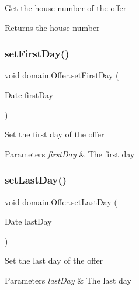 Get the house number of the offer

\begin{DoxyReturn}{Returns}
the house number 
\end{DoxyReturn}
\mbox{\label{classdomain_1_1_offer_aca5c8e3d34e700c8e51d1c9a0685e68f}} 
\subsubsection{\texorpdfstring{setFirstDay()}{setFirstDay()}}
{\footnotesize\ttfamily void domain.\+Offer.\+set\+First\+Day (\begin{DoxyParamCaption}\item[{Date}]{first\+Day }\end{DoxyParamCaption})}

Set the first day of the offer


\begin{DoxyParams}{Parameters}
{\em first\+Day} & The first day \\
\hline
\end{DoxyParams}
\mbox{\label{classdomain_1_1_offer_a52363278771059c51820160889c2bed1}} 
\subsubsection{\texorpdfstring{setLastDay()}{setLastDay()}}
{\footnotesize\ttfamily void domain.\+Offer.\+set\+Last\+Day (\begin{DoxyParamCaption}\item[{Date}]{last\+Day }\end{DoxyParamCaption})}

Set the last day of the offer


\begin{DoxyParams}{Parameters}
{\em last\+Day} & The last day \\
\hline
\end{DoxyParams}
\mbox{\label{classdomain_1_1_offer_a8bd526902732e030571b6889c5507f4c}} 
